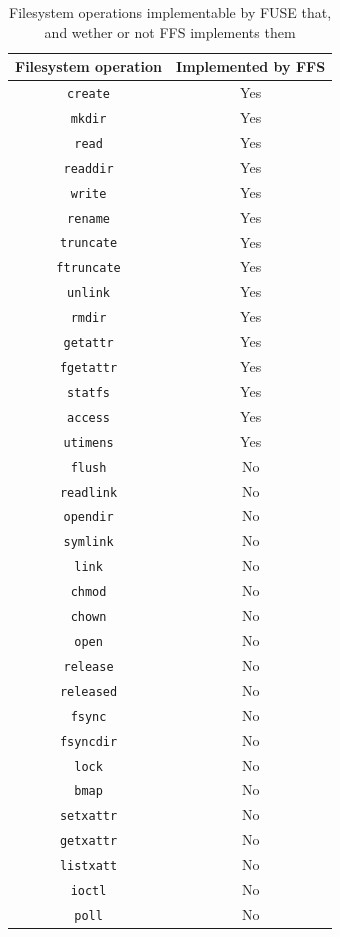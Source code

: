 \begin{table}[!ht]
	\begin{center}
		\caption{Filesystem operations implementable by FUSE that, and wether or not FFS implements them}
		\begin{tabular}{| c | c |}
			
			\hline
			\textbf{Filesystem operation} 	& \textbf{Implemented by FFS}\\
			\hline
			\hline
			\texttt{create} & Yes\\
			\texttt{mkdir} & Yes\\
			\texttt{read} & Yes\\
			\texttt{readdir} & Yes\\
			\texttt{write} & Yes\\
			\texttt{rename} & Yes\\
			\texttt{truncate} & Yes\\
			\texttt{ftruncate} & Yes\\
			\texttt{unlink} & Yes\\
			\texttt{rmdir} & Yes\\
			\texttt{getattr} & Yes\\
			\texttt{fgetattr} & Yes\\
			\texttt{statfs} & Yes\\
			\texttt{access} & Yes\\
			\texttt{utimens} & Yes\\
			\texttt{flush} & No\\
			\texttt{readlink} & No\\
			\texttt{opendir} & No\\
			\texttt{symlink} & No\\
			\texttt{link} & No\\
			\texttt{chmod} & No\\
			\texttt{chown} & No\\
			\texttt{open} & No\\
			\texttt{release} & No\\
			\texttt{released} & No\\
			\texttt{fsync} & No\\
			\texttt{fsyncdir} & No\\
			\texttt{lock} & No\\
			\texttt{bmap} & No\\
			\texttt{setxattr} & No\\
			\texttt{getxattr} & No\\
			\texttt{listxatt} & No\\
			\texttt{ioctl} & No\\
			\texttt{poll} & No\\
			\hline

		\end{tabular}
		\label{tbl:fs_impl_op}
	\end{center}
\end{table}

